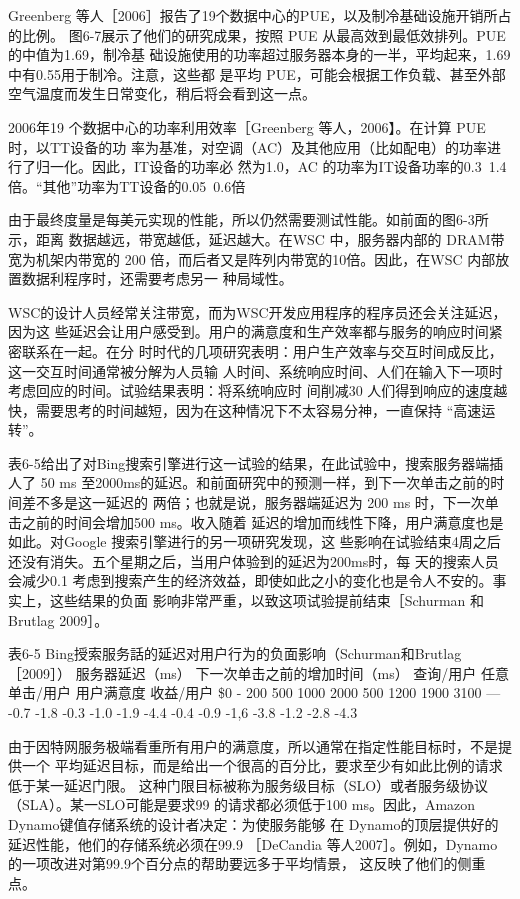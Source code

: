 Greenberg 等人［2006］报告了19个数据中心的PUE，以及制冷基础设施开销所占的比例。
图6-7展示了他们的研究成果，按照 PUE 从最高效到最低效排列。PUE 的中值为1.69，制冷基
础设施使用的功率超过服务器本身的一半，平均起来，1.69 中有0.55用于制冷。注意，这些都
是平均 PUE，可能会根据工作负载、甚至外部空气温度而发生日常变化，稍后将会看到这一点。

2006年19 个数据中心的功率利用效率［Greenberg 等人，2006】。在计算 PUE 时，以TT设备的功
率为基准，对空调（AC）及其他应用（比如配电）的功率进行了归一化。因此，IT设备的功率必
然为1.0，AC 的功率为IT设备功率的0.3~1.4倍。“其他”功率为TT设备的0.05~0.6倍

由于最终度量是每美元实现的性能，所以仍然需要测试性能。如前面的图6-3所示，距离
数据越远，带宽越低，延迟越大。在WSC 中，服务器内部的 DRAM带宽为机架内带宽的 200
倍，而后者又是阵列内带宽的10倍。因此，在WSC 内部放置数据利程序时，还需要考虑另一
种局域性。

WSC的设计人员经常关注带宽，而为WSC开发应用程序的程序员还会关注延迟，因为这
些延迟会让用户感受到。用户的满意度和生产效率都与服务的响应时间紧密联系在一起。在分
时时代的几项研究表明：用户生产效率与交互时间成反比，这一交互时间通常被分解为人员输
人时间、系统响应时间、人们在输入下一项时考虑回应的时间。试验结果表明：将系统响应时
间削减30%
人们得到响应的速度越快，需要思考的时间越短，因为在这种情况下不太容易分神，一直保持
“高速运转”。

表6-5给出了对Bing搜索引擎进行这一试验的结果，在此试验中，搜索服务器端插人了 50 ms
至2000ms的延迟。和前面研究中的预测一样，到下一次单击之前的时间差不多是这一延迟的
两倍；也就是说，服务器端延迟为 200 ms 时，下一次单击之前的时间会增加500 ms。收入随着
延迟的增加而线性下降，用户满意度也是如此。对Google 搜索引擎进行的另一项研究发现，这
些影响在试验结束4周之后还没有消失。五个星期之后，当用户体验到的延迟为200ms时，每
天的搜索人员会减少0.1%
考虑到搜索产生的经济效益，即使如此之小的变化也是令人不安的。事实上，这些结果的负面
影响非常严重，以致这项试验提前结束［Schurman 和 Brutlag 2009］。

表6-5 Bing授索服务話的延迟对用户行为的负面影响（Schurman和Brutlag ［2009］）
服务器延迟（ms）
下一次单击之前的增加时间（ms）
查询/用户
任意单击/用户
用户满意度
收益/用户
\$0
-
200
500
1000
2000
500
1200
1900
3100
—
-0.7%
-1.8%
-0.3%
-1.0%
-1.9%
-4.4%
-0.4%
-0.9%
-1,6%
-3.8%
-1.2%
-2.8%
-4.3%

由于因特网服务极端看重所有用户的满意度，所以通常在指定性能目标时，不是提供一个
平均延迟目标，而是给出一个很高的百分比，要求至少有如此比例的请求低于某一延迟门限。
这种门限目标被称为服务级目标（SLO）或者服务级协议（SLA）。某一SLO可能是要求99%
的请求都必须低于100 ms。因此，Amazon Dynamo键值存储系统的设计者决定：为使服务能够
在 Dynamo的顶层提供好的延迟性能，他们的存储系统必须在99.9%
［DeCandia 等人2007］。例如，Dynamo 的一项改进对第99.9个百分点的帮助要远多于平均情景，
这反映了他们的侧重点。

